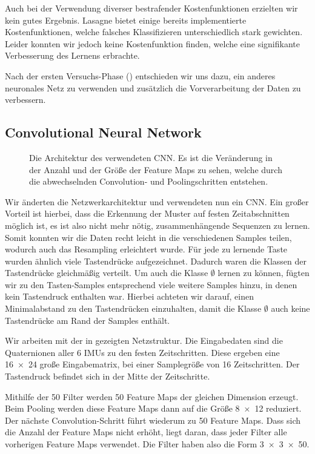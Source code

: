 Auch bei der Verwendung diverser bestrafender Kostenfunktionen erzielten wir kein gutes Ergebnis. Lasagne bietet einige bereits implementierte Kostenfunktionen, welche falsches Klassifizieren unterschiedlich stark gewichten. Leider konnten wir jedoch keine Kostenfunktion finden, welche eine signifikante Verbesserung des Lernens erbrachte.

Nach der ersten Versuchs-Phase () entschieden wir uns dazu, ein anderes neuronales Netz zu verwenden und zusätzlich die Vorverarbeitung der Daten zu verbessern.

\subsection{Convolutional Neural Network}

\begin{figure}
    \centering
    
    \caption[Architektur des verwendeten CNN]{Die Architektur des verwendeten CNN. Es ist die Veränderung in der Anzahl und der Größe der Feature Maps zu sehen, welche durch die abwechselnden Convolution- und Poolingschritten entstehen.}
\end{figure}

Wir änderten die Netzwerkarchitektur und verwendeten nun ein CNN. Ein großer Vorteil ist hierbei, dass die Erkennung der Muster auf festen Zeitabschnitten möglich ist, es ist also nicht mehr nötig, zusammenhängende Sequenzen zu lernen. Somit konnten wir die Daten recht leicht in die verschiedenen Samples teilen, wodurch auch das Resampling erleichtert wurde. Für jede zu lernende Taste wurden ähnlich viele Tastendrücke aufgezeichnet. Dadurch waren die Klassen der Tastendrücke gleichmäßig verteilt. Um auch die Klasse $\emptyset$ lernen zu können, fügten wir zu den Tasten-Samples entsprechend viele weitere Samples hinzu, in denen kein Tastendruck enthalten war. Hierbei achteten wir darauf, einen Minimalabstand zu den Tastendrücken einzuhalten, damit die Klasse $\emptyset$ auch keine Tastendrücke am Rand der Samples enthält.

Wir arbeiten mit der in  gezeigten Netzstruktur.
Die Eingabedaten sind die Quaternionen aller 6 IMUs zu den festen Zeitschritten. Diese ergeben eine \num{16 x 24} große Eingabematrix, bei einer Samplegröße von 16 Zeitschritten. Der Tastendruck befindet sich in der Mitte der Zeitschritte.

Mithilfe der 50 Filter werden 50 Feature Maps der gleichen Dimension erzeugt. Beim Pooling werden diese Feature Maps dann auf die Größe \num{8x12} reduziert. Der nächste Convolution-Schritt führt wiederum zu 50 Feature Maps. Dass sich die Anzahl der Feature Maps nicht erhöht, liegt daran, dass jeder Filter alle vorherigen Feature Maps verwendet. Die Filter haben also die Form \num{3x3x50}.

